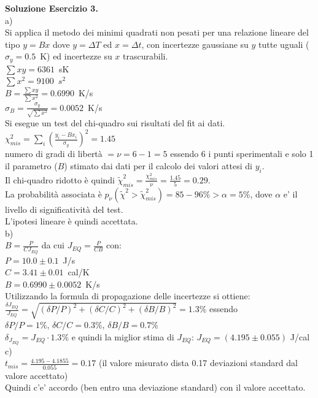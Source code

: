 \documentclass[10pt,a4paper,fleqn]{article}
\begin{document}
{\bf Soluzione Esercizio 3.}\\

a) \\
Si applica il metodo dei minimi quadrati non pesati per una relazione
lineare del tipo $y=Bx$ dove $y=\Delta T$ ed $x=\Delta t$, con
incertezze gaussiane su $y$ tutte uguali ($\sigma_y=0.5$~K) 
ed incertezze su $x$ trascurabili.\\
$\sum xy = 6361$~sK \\
$\sum x^2=9100$~$s^2$\\
$B=\frac{\sum xy}{\sum x^2}=0.6990$~K/s\\
$\sigma_B=\frac{\sigma_y}{\sqrt{\sum x^2}}=0.0052$~K/s\\

Si esegue un test del chi-quadro sui risultati del fit ai dati.\\
$\chi^2_{mis}=\sum_i \left( \frac{y_i-Bx_i}{\sigma_y}
\right)^2=1.45$\\
numero di gradi di libert\`a $=\nu=6-1=5$ essendo 6 i punti
sperimentali e solo 1 il parametro ($B$) stimato dai dati per il
calcolo dei valori attesi di $y_i$. \\
Il chi-quadro ridotto \`e quindi
$\tilde{\chi}^2_{mis}=\frac{\chi^2_{mis}}{\nu}=\frac{1.45}{5}=0.29$.\\
La probabilit\`a associata \`e
$p_{\nu}(\tilde{\chi}^2>\tilde{\chi}^2_{mis})=85-96\%>\alpha=5\%$,
dove $\alpha$ e' il livello di significativit\`a del test.\\
L'ipotesi lineare \`e quindi accettata.\\

b) \\

$B=\frac{P}{C J_{EQ}}$ da cui $J_{EQ}=\frac{P}{CB}$ con:\\
$P=10.0 \pm 0.1 $~J/s\\
$C=3.41 \pm 0.01$~cal/K\\
$B=0.6990\pm 0.0052$~K/s\\

Utilizzando la formula di propagazione delle incertezze si ottiene:\\
$\frac{\delta J_{EQ}}{J_{EQ}}=\sqrt{(\delta P/P)^2 + (\delta C/C)^2 +
  (\delta B/B)^2}=1.3\%$ essendo\\
$\delta P/P=1\%$, $\delta C/C=0.3\%$, $\delta B/B=0.7\%$\\
$\delta_{J_{EQ}}=J_{EQ}\cdot 1.3\%$ e quindi la miglior stima di
$J_{EQ}$:
$J_{EQ}=(4.195 \pm 0.055)$ J/cal\\

c) \\

$t_{mis}=\frac{4.195-4.1855}{0.055}=0.17$ (il valore misurato dista
0.17 deviazioni standard dal valore accettato)\\ 
Quindi c'e' accordo (ben entro una deviazione standard) con
il valore accettato. 













 
\end{document}
